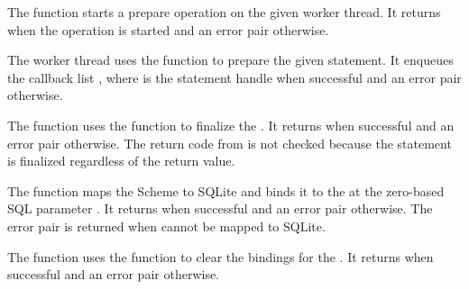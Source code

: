The  function starts a prepare operation
on the given  worker thread. It returns  when
the operation is started and an error pair otherwise.

The worker thread uses the  function to
prepare the given  statement. It enqueues the callback list
, where  is the
statement handle when successful and an error pair otherwise.

\begin{function}
\end{function}

The  function uses the
 function to finalize the .  It
returns  when successful and an error pair otherwise. The
return code from  is not checked because the
statement is finalized regardless of the return value.

\begin{function}
\end{function}

The  function maps the Scheme 
to SQLite and binds it to the  at the zero-based SQL
parameter .  It returns  when successful and an
error pair otherwise. The error pair  is returned when  cannot be
mapped to SQLite.

\begin{function}
\end{function}

The  function uses the
 function to clear the bindings for the
. It returns  when successful and an error
pair otherwise.

\begin{function}
\end{function}


